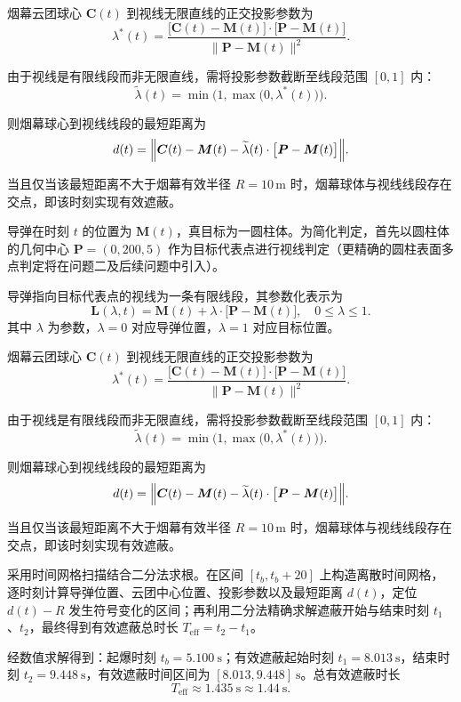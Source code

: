 \documentclass[12pt,a4paper]{article}
\begin{document}
	
	烟幕云团球心 $\boldsymbol{C}(t)$ 到视线无限直线的正交投影参数为
	\[
	\lambda^{*}(t)=\frac{\bigl[\boldsymbol{C}(t)-\boldsymbol{M}(t)\bigr]\cdot \bigl[\boldsymbol{P}-\boldsymbol{M}(t)\bigr]}{\bigl\|\boldsymbol{P}-\boldsymbol{M}(t)\bigr\|^{2}}.
	\]
	
	由于视线是有限线段而非无限直线，需将投影参数截断至线段范围 $[0,1]$ 内：
	\[
	\widetilde{\lambda}(t)=\min\bigl(1,\max\bigl(0,\lambda^{*}(t)\bigr)\bigr).
	\]
	
	则烟幕球心到视线线段的最短距离为
	\[
	d(t)=\Bigl\|\boldsymbol{C}(t)-\boldsymbol{M}(t)-\widetilde{\lambda}(t)\cdot \bigl[\boldsymbol{P}-\boldsymbol{M}(t)\bigr]\Bigr\|.
	\]
	
	当且仅当该最短距离不大于烟幕有效半径 $R=10\,\text{m}$ 时，烟幕球体与视线线段存在交点，即该时刻实现有效遮蔽。
	
	导弹在时刻 $t$ 的位置为 $\boldsymbol{M}(t)$，真目标为一圆柱体。为简化判定，首先以圆柱体的几何中心 $\boldsymbol{P}=(0,200,5)$ 作为目标代表点进行视线判定（更精确的圆柱表面多点判定将在问题二及后续问题中引入）。
	
	导弹指向目标代表点的视线为一条有限线段，其参数化表示为
	\[
	\boldsymbol{L}(\lambda,t)=\boldsymbol{M}(t)+\lambda\cdot \bigl[\boldsymbol{P}-\boldsymbol{M}(t)\bigr],\quad 0\le \lambda\le 1.
	\]
	其中 $\lambda$ 为参数，$\lambda=0$ 对应导弹位置，$\lambda=1$ 对应目标位置。
	

	烟幕云团球心 $\boldsymbol{C}(t)$ 到视线无限直线的正交投影参数为
	\[
	\lambda^{*}(t)=\frac{\bigl[\boldsymbol{C}(t)-\boldsymbol{M}(t)\bigr]\cdot \bigl[\boldsymbol{P}-\boldsymbol{M}(t)\bigr]}{\bigl\|\boldsymbol{P}-\boldsymbol{M}(t)\bigr\|^{2}}.
	\]
	
	由于视线是有限线段而非无限直线，需将投影参数截断至线段范围 $[0,1]$ 内：
	\[
	\widetilde{\lambda}(t)=\min\bigl(1,\max\bigl(0,\lambda^{*}(t)\bigr)\bigr).
	\]
	
	则烟幕球心到视线线段的最短距离为
	\[
	d(t)=\Bigl\|\boldsymbol{C}(t)-\boldsymbol{M}(t)-\widetilde{\lambda}(t)\cdot \bigl[\boldsymbol{P}-\boldsymbol{M}(t)\bigr]\Bigr\|.
	\]
	
	当且仅当该最短距离不大于烟幕有效半径 $R=10\,\text{m}$ 时，烟幕球体与视线线段存在交点，即该时刻实现有效遮蔽。
	
	
	采用时间网格扫描结合二分法求根。在区间 $[t_b,t_b+20]$ 上构造离散时间网格，逐时刻计算导弹位置、云团中心位置、投影参数以及最短距离 $d(t)$，定位 $d(t)-R$ 发生符号变化的区间；再利用二分法精确求解遮蔽开始与结束时刻 $t_1$、$t_2$，最终得到有效遮蔽总时长 $T_{\mathrm{eff}}=t_2-t_1$。
	
	
	经数值求解得到：起爆时刻 $t_b=5.100\ \mathrm{s}$；有效遮蔽起始时刻 $t_1=8.013\ \mathrm{s}$，结束时刻 $t_2=9.448\ \mathrm{s}$，有效遮蔽时间区间为 $[8.013,9.448]\ \mathrm{s}$。总有效遮蔽时长
	\[
	\boxed{T_{\mathrm{eff}}\approx 1.435\ \mathrm{s}\approx 1.44\ \mathrm{s}.}
	\]
	
\end{document}
